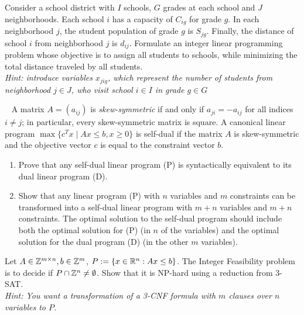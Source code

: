 \documentclass{uebung_cs}
\begin{document}
\begin{aufgabe}
	Consider a school district with $I$ schools, $G$ grades at each school and $J$ neighborhoods. Each school $i$ has a capacity of $C_{ig}$ for grade $g$. In each neighborhood $j$, the student population of grade $g$ is $S_{jg}$. Finally, the distance of school $i$ from neighborhood $j$ is $d_{ij}$. Formulate an integer linear programming problem whose objective is to assign all students to schools, while minimizing the total distance traveled by all students.\\
	\emph{Hint: introduce variables $x_{jig}$, which represent the number of students from neighborhood $j \in J$, who visit school $i \in I$ in grade $g \in G$}
\end{aufgabe}


\begin{aufgabe}\
	A matrix $A=(a_{ij})$ is \emph{skew-symmetric} if and only if $a_{ji} = −a_{ij}$ for all indices $i \neq j$; in particular, every skew-symmetric matrix is square. A canonical linear program $\max\{c^T x  \; | \; Ax \leq b, x \geq 0\}$ is self-dual if the matrix $A$ is skew-symmetric and the objective vector $c$ is equal to the constraint vector $b$.
	\begin{enumerate}
		\item Prove that any self-dual linear program (P) is syntactically equivalent to its dual linear program (D).
		\item Show that any linear program (P) with $n$ variables and $m$ constraints can be transformed into a self-dual linear program with $m + n$ variables and $m + n$ constraints. The optimal solution to the self-dual program should include both the optimal solution for (P) (in $n$ of the variables) and the optimal solution for the dual program (D) (in the other $m$ variables).
	\end{enumerate}
\end{aufgabe}

\begin{aufgabe}
	Let $A \in \mathbb{Z}^{m\times n}, b \in \mathbb{Z}^m$, $P := \{x \in \mathbb{R}^n : Ax \leq b \}$.
	The Integer Feasibility problem is to decide if $P \cap \mathbb{Z}^n \neq \emptyset$.
	Show that it is NP-hard using a reduction from 3-SAT. \\
	\emph{Hint: You want a transformation of a 3-CNF formula with $m$ clauses over $n$ variables to $P$.}
\end{aufgabe}
\end{document}
